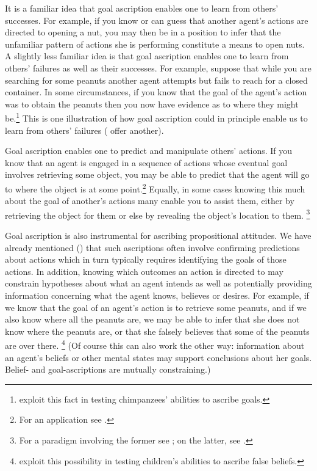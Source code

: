 \documentclass[12pt,\papersize]{extarticle}
\begin{document}
It is a familiar idea that goal ascription enables one to learn from others' successes.
For example,
if you know or can guess that another agent's actions are directed to opening a nut,
you may then be in a position to infer that the unfamiliar pattern of actions she is performing constitute a means to open nuts.
A slightly less familiar idea is that goal ascription enables one to learn from others' failures as well as their successes.
For example, suppose that while you are searching for some peanuts 
another agent attempts but fails to reach for a closed container.
In some circumstances,
if you know that the goal of the agent's action was to obtain the peanuts
then you now have evidence as to where they might be.\footnote{
\citet{hare_chimpanzees_2004} exploit this fact in testing chimpanzees' abilities to ascribe goals.
}
This is one illustration of how goal ascription could in principle enable us to learn from others' failures 
(\citealp{Want:2001hp} offer another).


Goal ascription enables one
to predict and manipulate others' actions.
If you know that an agent is engaged in a sequence of actions whose eventual goal involves retrieving some object,
you may be able to predict that the agent will go to where the object is at some point.\footnote{
For an application see \citet{Hare:2001ph}.
}
Equally, in some cases knowing this much about the goal of another's actions many enable you to assist them,
either 
by retrieving the object for them 
or else
by revealing the object's location to them.%
\footnote{
For a paradigm involving the former see \citet{warneken:2007sa};
on the latter, see \citet{Liszkowski:2008al}.
}

Goal ascription is also instrumental for ascribing propositional attitudes.
We have already mentioned 
   ()
that such ascriptions often involve 
confirming predictions about actions 
which in turn typically requires
identifying the goals of those actions.
In addition,
knowing which outcomes an action is directed to may constrain hypotheses about what an agent intends 
as well as
potentially providing information concerning what the agent knows, believes or desires.
For example,
if we know that the goal of an agent's action is to retrieve some peanuts,
and if we also know where all the peanuts are,
we may be able to infer that she does not know where the peanuts are,
or that she falsely believes that some of the peanuts are over there.%
\footnote{
\citet{Wimmer:1998kx} exploit this possibility in testing children's abilities to ascribe false beliefs.
}
(Of course this can also work the other way:
information about an agent's beliefs or other mental states may support conclusions about her goals.
Belief- and goal-ascriptions are mutually constraining.)
\end{document}
